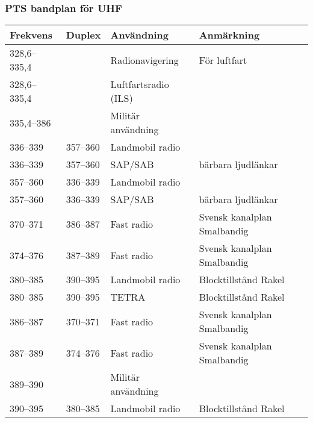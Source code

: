 \begin{landscape}
\subsubsection{PTS bandplan för UHF}
\begin{longtable}{llll}
	\textbf{Frekvens}  & \textbf{Duplex}    & \textbf{Användning}     & \textbf{Anmärkning}                   \\ \hline
	\endhead
	328,6--335,4       &                    & Radionavigering         & För luftfart                          \\
	328,6--335,4       &                    & Luftfartsradio (ILS)    &                                       \\
	335,4--386         &                    & Militär användning      &                                       \\
	336--339           & 357--360           & Landmobil radio         &                                       \\
	336--339           & 357--360           & SAP/SAB                 & bärbara ljudlänkar                    \\
	357--360           & 336--339           & Landmobil radio         &                                       \\
	357--360           & 336--339           & SAP/SAB                 & bärbara ljudlänkar                    \\
	370--371           & 386--387           & Fast radio              & Svensk kanalplan Smalbandig           \\
	374--376           & 387--389           & Fast radio              & Svensk kanalplan Smalbandig           \\
	380--385           & 390--395           & Landmobil radio         & Blocktillstånd Rakel                  \\
	380--385           & 390--395           & TETRA                   & Blocktillstånd Rakel                  \\
	386--387           & 370--371           & Fast radio              & Svensk kanalplan Smalbandig           \\
	387--389           & 374--376           & Fast radio              & Svensk kanalplan Smalbandig           \\
	389--390           &                    & Militär användning      &                                       \\
	390--395           & 380--385           & Landmobil radio         & Blocktillstånd Rakel                  \\

\end{longtable}
\end{landscape}
